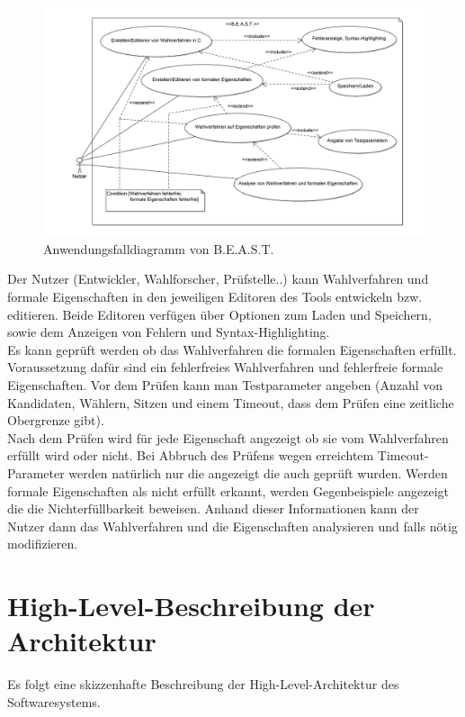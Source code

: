 \documentclass[a4paper]{scrreprt}
\begin{document}
\begin{figure}[H]
\hspace{-3cm}
\includegraphics[scale=0.12]{UseCaseDiagram.png}
\caption{Anwendungsfalldiagramm von B.E.A.S.T.}
\label{Packet-scetch}
\end{figure}

Der Nutzer (Entwickler, Wahlforscher, Prüfstelle..) kann Wahlverfahren und formale Eigenschaften in den jeweiligen Editoren des Tools entwickeln bzw. editieren.
Beide Editoren verfügen über Optionen zum Laden und Speichern, sowie dem Anzeigen von Fehlern und Syntax-Highlighting.\\
Es kann geprüft werden ob das Wahlverfahren die formalen Eigenschaften erfüllt. Voraussetzung dafür sind ein fehlerfreies Wahlverfahren und fehlerfreie formale Eigenschaften. Vor dem Prüfen kann man Testparameter angeben (Anzahl von Kandidaten, Wählern, Sitzen und einem Timeout, dass dem Prüfen eine zeitliche Obergrenze gibt).\\
Nach dem Prüfen wird für jede Eigenschaft angezeigt ob sie vom Wahlverfahren erfüllt wird oder nicht. Bei Abbruch des Prüfens wegen erreichtem Timeout-Parameter werden natürlich nur die angezeigt die auch geprüft wurden. Werden formale Eigenschaften als nicht erfüllt erkannt, werden Gegenbeispiele angezeigt die die Nichterfüllbarkeit beweisen. Anhand dieser Informationen kann der Nutzer dann das Wahlverfahren und die Eigenschaften analysieren und falls nötig modifizieren.

\section{High-Level-Beschreibung der Architektur}	
Es folgt eine skizzenhafte Beschreibung der High-Level-Architektur des Softwaresystems. 
\end{document}
